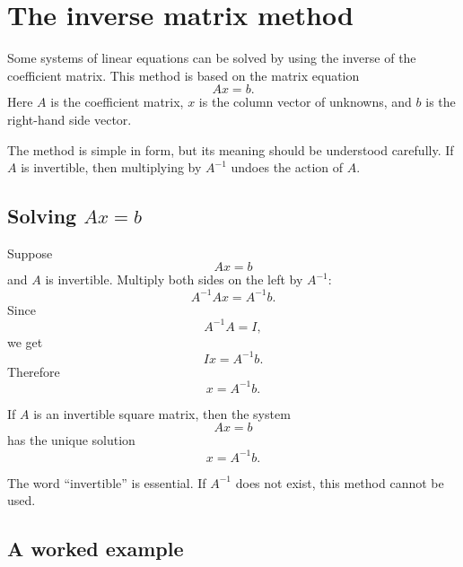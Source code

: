 \section{The inverse matrix method}

Some systems of linear equations can be solved by using the inverse of the coefficient matrix. This method is based on the matrix equation
\[
Ax=b.
\]
Here \(A\) is the coefficient matrix, \(x\) is the column vector of unknowns, and \(b\) is the right-hand side vector.

The method is simple in form, but its meaning should be understood carefully. If \(A\) is invertible, then multiplying by \(A^{-1}\) undoes the action of \(A\).

\subsection*{Solving \(Ax=b\)}

Suppose
\[
Ax=b
\]
and \(A\) is invertible. Multiply both sides on the left by \(A^{-1}\):
\[
A^{-1}Ax=A^{-1}b.
\]
Since
\[
A^{-1}A=I,
\]
we get
\[
Ix=A^{-1}b.
\]
Therefore
\[
x=A^{-1}b.
\]

\begin{theorembox}
If \(A\) is an invertible square matrix, then the system
\[
Ax=b
\]
has the unique solution
\[
x=A^{-1}b.
\]
\end{theorembox}

The word ``invertible'' is essential. If \(A^{-1}\) does not exist, this method cannot be used.

\subsection*{A worked example}

